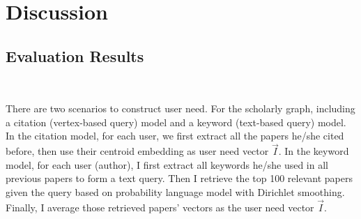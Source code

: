 \section{Discussion} 
\subsection{Evaluation Results}  \

There are two scenarios to construct user need. For the scholarly graph, including a citation (vertex-based query) model and a keyword (text-based query) model. In the citation model, for each user, we first extract all the papers he/she cited before, then use their centroid embedding as user need vector  $\vec{I}$. In the keyword model, for each user (author), I first extract all keywords he/she used in all previous papers to form a text query. Then I retrieve the top 100 relevant papers given the query based on probability language model with Dirichlet smoothing. Finally, I average those retrieved papers' vectors as the user need vector $\vec{I}$.

